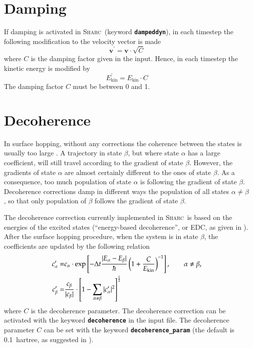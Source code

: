 \documentclass[a4paper,11pt,DIV=15,openany,twoside=false]{scrbook}
\newcommand{\sharc}{\textsc{Sharc}}
\newcommand{\ttt}[1]{\textbf{\texttt{#1}}}
\newcommand{\VEC}[1]{\ensuremath{\mathbf{#1}}}
\begin{document}
\section{Damping}\label{met:damping}

If damping is activated in \sharc\ (keyword \ttt{dampeddyn}), in each timestep the following modification to the velocity vector is made
\begin{equation}
  \VEC{v}^\prime=\VEC{v}\cdot\sqrt{C}
\end{equation}
where $C$ is the damping factor given in the input. Hence, in each timestep the kinetic energy is modified by
\begin{equation}
  E_{\text{kin}}^\prime=E_{\text{kin}}\cdot C
\end{equation}
The damping factor $C$ must be between 0 and 1.


\section{Decoherence}\label{met:decoherence}

In surface hopping, without any corrections the coherence between the states is usually too large \cite{Granucci2007JCP}. A trajectory in state $\beta$, but where state $\alpha$ has a large coefficient, will still travel according to the gradient of state $\beta$. However, the gradients of state $\alpha$ are almost certainly different to the ones of state $\beta$. As a consequence, too much population of state $\alpha$ is following the gradient of state $\beta$. Decoherence corrections damp in different ways the population of all states $\alpha\neq\beta$, so that only population of $\beta$ follows the gradient of state $\beta$.

The decoherence correction currently implemented in \sharc\ is based on the energies of the excited states (``energy-based decoherence'', or EDC, as given in \cite{Granucci2010JCP}). After the surface hopping procedure, when the system is in state $\beta$, the coefficients are updated by the following relation
\begin{align}
  c_\alpha^\prime=&
  c_\alpha\cdot\exp
  \left[
    -\Delta t\frac{|E_\alpha-E_\beta|}{\hbar}
    \left(
      1+\frac{C}{E_{\text{kin}}}
    \right)^{-1}
  \right],\qquad \alpha\neq\beta,\\
  c_\beta^\prime=&
  \frac{c_\beta}{|c_\beta|}\cdot
  \left[
    1-\sum\limits_{\alpha\neq\beta}^{\vphantom{\alpha}} |c^\prime_\alpha|^2
  \right]^{\frac{1}{2}}
\end{align}
where $C$ is the decoherence parameter. The decoherence correction can be activated with the keyword \ttt{decoherence} in the input file. The decoherence parameter $C$ can be set with the keyword \ttt{decoherence\_param} (the default is 0.1~hartree, as suggested in \cite{Granucci2010JCP}).
\end{document}
